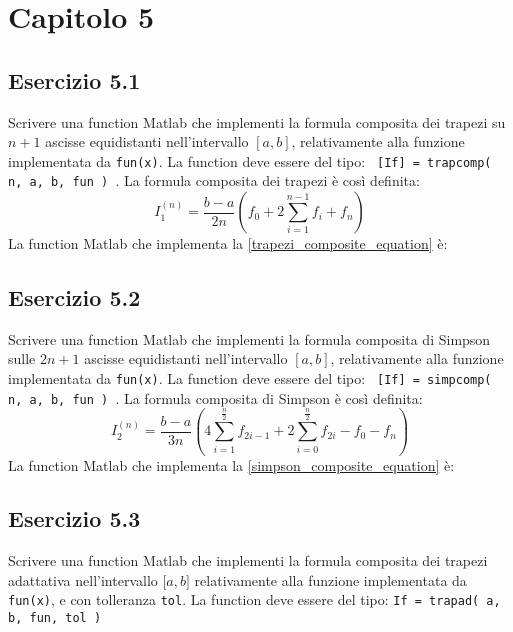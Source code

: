 \section{Capitolo 5}



	\subsection{Esercizio 5.1}
Scrivere una function Matlab che implementi la formula composita dei trapezi su $n+1$ ascisse equidistanti nell'intervallo $[a, b]$, relativamente alla funzione implementata da \texttt{fun(x)}. 
La function deve essere del tipo: \texttt{ [If] = trapcomp( n, a, b, fun ) }.
La formula composita dei trapezi è così definita:
\begin{equation}\label{trapezi_composite_equation}
	I_1^{(n)} = \frac{b-a}{2n} (f_0 + 2\sum_{i=1}^{n-1}f_i + f_n)
\end{equation}
La function Matlab che implementa la \ref{trapezi_composite_equation} è:




	\subsection{Esercizio 5.2}
Scrivere una function Matlab che implementi la formula composita di Simpson sulle $2n+1$ ascisse equidistanti nell'intervallo $[a, b]$, relativamente alla funzione implementata da \texttt{fun(x)}. 
La function deve essere del tipo: \texttt{ [If] = simpcomp( n, a, b, fun ) }.
La formula composita di Simpson è così definita:
\begin{equation}\label{simpson_composite_equation}
	I_2^{(n)} = \frac{b-a}{3n} (4\sum_{i=1}^{\frac{n}{2}}f_{2i-1} +2\sum_{i=0}^{\frac{n}{2}}f_{2i} - f_0 - f_n)
\end{equation}
La function Matlab che implementa la \ref{simpson_composite_equation} è:




	\subsection{Esercizio 5.3}
	Scrivere una function Matlab che implementi la formula composita dei trapezi adattativa nell’intervallo $\lbrack a,b \rbrack$  relativamente alla funzione implementata da \lstinline{fun(x)}, e con tolleranza \lstinline{tol}. La function deve essere del tipo: \lstinline{If = trapad( a, b, fun, tol )}
	
